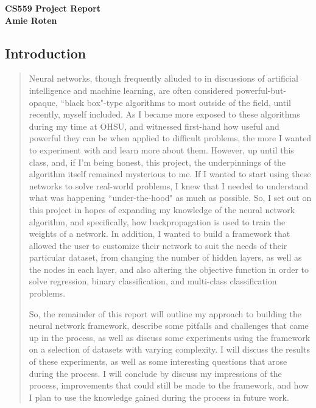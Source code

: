 \documentclass{article}
\begin{document}
	
\begin{center}
\LARGE\bf CS559 Project Report\\
Amie Roten
\end{center}

\subsection*{Introduction}
\begin{quote}
\setlength{\parindent}{10ex}
\quad\quad\quad\quad Neural networks, though frequently alluded to in discussions of artificial intelligence and machine learning, are often considered powerful-but-opaque, ``black box"-type algorithms to most outside of the field, until recently, myself included. As I became more exposed to these algorithms during my time at OHSU, and witnessed first-hand how useful and powerful they can be when applied to difficult problems, the more I wanted to experiment with and learn more about them. However, up until this class, and, if I'm being honest, this project, the underpinnings of the algorithm itself remained mysterious to me. If I wanted to start using these networks to solve real-world problems, I knew that I needed to understand what was happening ``under-the-hood" as much as possible. So, I set out on this project in hopes of expanding my knowledge of the neural network algorithm, and specifically, how backpropagation is used to train the weights of a network. In addition, I wanted to build a framework that allowed the user to customize their network to suit the needs of their particular dataset, from changing the number of hidden layers, as well as the nodes in each layer, and also altering the objective function in order to solve regression, binary classification, and multi-class classification problems. \par


So, the remainder of this report will outline my approach to building the neural network framework, describe some pitfalls and challenges that came up in the process, as well as discuss some experiments using the framework on a selection of datasets with varying complexity. I will discuss the results of these experiments, as well as some interesting questions that arose during the process. I will conclude by discuss my impressions of the process, improvements that could still be made to the framework, and how I plan to use the knowledge gained during the process in future work.
\end{quote}
\end{document}

